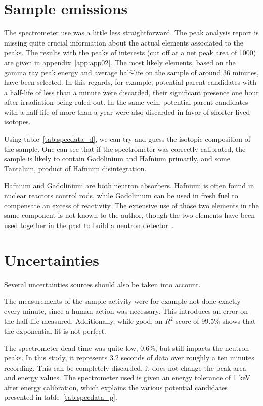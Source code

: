 \section{Sample emissions}

The spectrometer use was a little less straightforward. The peak analysis report is missing quite crucial information about the actual elements associated to the peaks. The results with the peaks of interests (cut off at a net peak area of 1000) are given in appendix~\ref{app:app02}. The most likely elements, based on the gamma ray peak energy and average half-life on the sample of around 36 minutes, have been selected. In this regards, for example, potential parent candidates with a half-life of less than a minute were discarded, their significant presence one hour after irradiation being ruled out. In the same vein, potential parent candidates with a half-life of more than a year were also discarded in favor of shorter lived isotopes.

Using table~\ref{tab:specdata_d}, we can try and guess the isotopic composition of the sample. One can see that if the spectrometer was correctly calibrated, the sample is likely to contain Gadolinium and Hafnium primarily, and some Tantalum, product of Hafnium disintegration.

Hafnium and Gadolinium are both neutron absorbers. Hafnium is often found in nuclear reactors control rods, while Gadolinium can be used in fresh fuel to compensate an excess of reactivity. The extensive use of those two elements in the same component is not known to the author, though the two elements have been used together in the past to build a neutron detector~\cite{imel95}.


\section{Uncertainties}

Several uncertainties sources should also be taken into account.

The measurements of the sample activity were for example not done exactly every minute, since a human action was necessary. This introduces an error on the half-life measured. Additionally, while good, an $R^2$ score of 99.5\% shows that the exponential fit is not perfect.

The spectrometer dead time was quite low, 0.6\%, but still impacts the neutron peaks. In this study, it represents 3.2 seconds of data over roughly a ten minutes recording. This can be completely discarded, it does not change the peak area and energy values. The spectrometer used is given an energy tolerance of 1 keV after energy calibration, which explains the various potential candidates presented in table~\ref{tab:specdata_p}.
